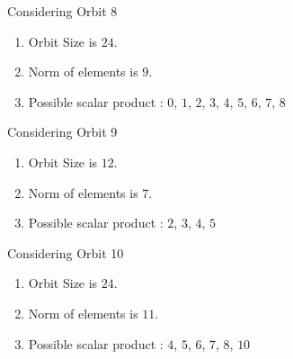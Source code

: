 \documentclass[12pt]{article}
\begin{document}
Considering Orbit 8
\begin{enumerate}
\item Orbit Size is $24$.
\item Norm of elements is $9$.
\item Possible scalar product : $0$, $1$, $2$, $3$, $4$, $5$, $6$, $7$, $8$
\end{enumerate}
Considering Orbit 9
\begin{enumerate}
\item Orbit Size is $12$.
\item Norm of elements is $7$.
\item Possible scalar product : $2$, $3$, $4$, $5$
\end{enumerate}
Considering Orbit 10
\begin{enumerate}
\item Orbit Size is $24$.
\item Norm of elements is $11$.
\item Possible scalar product : $4$, $5$, $6$, $7$, $8$, $10$
\end{enumerate}
\end{document}
